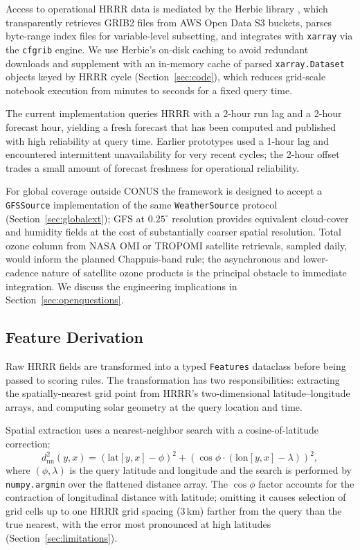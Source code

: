 \documentclass[11pt,a4paper]{article}
\begin{document}
Access to operational HRRR data is mediated by the Herbie library \citep{blaylock2024herbie}, which transparently retrieves GRIB2 files from AWS Open Data S3 buckets, parses byte-range index files for variable-level subsetting, and integrates with \texttt{xarray} via the \texttt{cfgrib} engine. We use Herbie's on-disk caching to avoid redundant downloads and supplement with an in-memory cache of parsed \texttt{xarray.Dataset} objects keyed by HRRR cycle (Section~\ref{sec:code}), which reduces grid-scale notebook execution from minutes to seconds for a fixed query time.

The current implementation queries HRRR with a 2-hour run lag and a 2-hour forecast hour, yielding a fresh forecast that has been computed and published with high reliability at query time. Earlier prototypes used a 1-hour lag and encountered intermittent unavailability for very recent cycles; the 2-hour offset trades a small amount of forecast freshness for operational reliability.

For global coverage outside CONUS the framework is designed to accept a \texttt{GFSSource} implementation of the same \texttt{WeatherSource} protocol (Section~\ref{sec:globalext}); GFS at $0.25^\circ$ resolution provides equivalent cloud-cover and humidity fields at the cost of substantially coarser spatial resolution. Total ozone column from NASA OMI or TROPOMI satellite retrievals, sampled daily, would inform the planned Chappuis-band rule; the asynchronous and lower-cadence nature of satellite ozone products is the principal obstacle to immediate integration. We discuss the engineering implications in Section~\ref{sec:openquestions}.

\subsection{Feature Derivation}

Raw HRRR fields are transformed into a typed \texttt{Features} dataclass before being passed to scoring rules. The transformation has two responsibilities: extracting the spatially-nearest grid point from HRRR's two-dimensional latitude--longitude arrays, and computing solar geometry at the query location and time.

Spatial extraction uses a nearest-neighbor search with a cosine-of-latitude correction:
\begin{equation}
d^2_{\text{nn}}(y, x) = (\text{lat}[y,x] - \phi)^2 + (\cos\phi \cdot (\text{lon}[y,x] - \lambda))^2,
\label{eq:coslat}
\end{equation}
where $(\phi, \lambda)$ is the query latitude and longitude and the search is performed by \texttt{numpy.argmin} over the flattened distance array. The $\cos\phi$ factor accounts for the contraction of longitudinal distance with latitude; omitting it causes selection of grid cells up to one HRRR grid spacing (3\,km) farther from the query than the true nearest, with the error most pronounced at high latitudes (Section~\ref{sec:limitations}).
\end{document}
